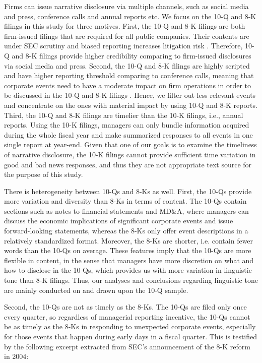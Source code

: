 \documentclass[a4paper]{article}
\begin{document}
\begin{spacing}{2}
Firms can issue narrative disclosure via multiple channels, such as social media and press, conference calls and annual reports etc. We focus on the 10-Q and 8-K filings in this study for three motives. First, the 10-Q and 8-K filings are both firm-issued filings that are required for all public companies. Their contents are under SEC scrutiny and biased reporting increases litigation risk . Therefore, 10-Q and 8-K filings provide higher credibility comparing to firm-issued disclosures via social media and press. Second, the 10-Q and 8-K filings are highly scripted and have higher reporting threshold comparing to conference calls, meaning that corporate events need to have a moderate impact on firm operations in order to be discussed in the 10-Q and 8-K filings . Hence, we filter out less relevant events and concentrate on the ones with material impact by using 10-Q and 8-K reports. Third, the 10-Q and 8-K filings are timelier than the 10-K filings, i.e., annual reports. Using the 10-K filings, managers can only bundle information acquired during the whole fiscal year and make summarized responses to all events in one single report at year-end. Given that one of our goals is to examine the timeliness of narrative disclosure, the 10-K filings cannot provide sufficient time variation in good and bad news responses, and thus they are not appropriate text source for the purpose of this study.

There is heterogeneity between 10-Qs and 8-Ks as well. First, the 10-Qs provide more variation and diversity than 8-Ks in terms of content. The 10-Qs contain sections such as notes to financial statements and MD\&A, where managers can discuss the economic implications of significant corporate events and issue forward-looking statements, whereas the 8-Ks only offer event descriptions in a relatively standardized format. Moreover, the 8-Ks are shorter, i.e. contain fewer words than the 10-Qs on average. These features imply that the 10-Qs are more flexible in content, in the sense that managers have more discretion on what and how to disclose in the 10-Qs, which provides us with more variation in linguistic tone than 8-K filings. Thus, our analyses and conclusions regarding linguistic tone are mainly conducted on and drawn upon the 10-Q sample. 

Second, the 10-Qs are not as timely as the 8-Ks. The 10-Qs are filed only once every quarter, so regardless of managerial reporting incentive, the 10-Qs cannot be as timely as the 8-Ks in responding to unexpected corporate events, especially for those events that happen during early days in a fiscal quarter. This is testified by the following excerpt extracted from SEC's announcement of the 8-K reform in 2004:


\end{spacing}
\end{document}
